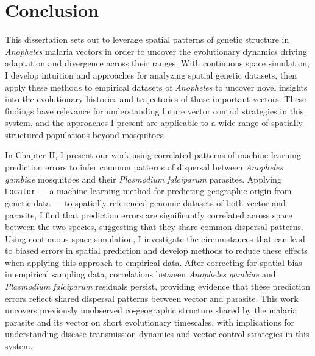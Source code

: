 \chapter{Conclusion}


This dissertation sets out to leverage spatial patterns of genetic structure in \textit{Anopheles}
malaria vectors in order to uncover the evolutionary dynamics driving adaptation and 
divergence across their ranges.
With continuous space simulation, I develop intuition and approaches for analyzing
spatial genetic datasets, then apply these methods to empirical datasets of \textit{Anopheles}
to uncover novel insights into the evolutionary histories and trajectories of these important vectors.
These findings have relevance for understanding future vector control strategies in this system,
and the approaches I present are applicable to a wide range of spatially-structured populations beyond mosquitoes.

In Chapter II, I present our work using correlated patterns of machine learning
prediction errors to infer common patterns of dispersal between \textit{Anopheles gambiae} 
mosquitoes and their \textit{Plasmodium falciparum} parasites. 
Applying \texttt{Locator} --- a machine learning method for predicting geographic origin from genetic data ---
to spatially-referenced genomic datasets of both vector and parasite,
I find that prediction errors are significantly correlated across space between the two species,
suggesting that they share common dispersal patterns.
Using continuous-space simulation, I investigate the circumstances that
can lead to biased errors in spatial prediction and develop methods 
to reduce these effects when applying this approach to empirical data.
After correcting for spatial bias in empirical sampling data,
correlations between \textit{Anopheles gambiae} and \textit{Plasmodium falciparum} residuals persist,
providing evidence that these prediction errors reflect shared dispersal patterns 
between vector and parasite. This work uncovers previously unobserved co-geographic structure shared by
the malaria parasite and its vector on short evolutionary timescales, with 
implications for understanding disease transmission dynamics and vector control strategies in this system.

